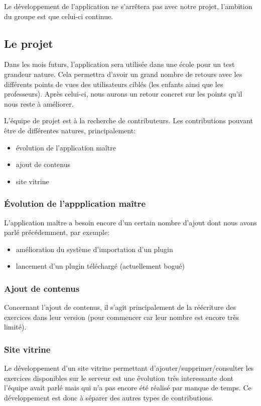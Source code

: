Le développement de l'application ne s'arrêtera pas avec notre projet, l'ambition du groupe est que celui-ci continue.


\subsection{Le projet}
Dans les mois futurs, l'application sera utilisée dans une école pour un test grandeur nature. 
Cela permettra d'avoir un grand nombre de retours avec les différents points de vues des utilisateurs ciblés (les enfants ainsi que les professeurs). 
Après celui-ci, nous aurons un retour concret sur les points qu'il nous reste à améliorer.


L'équipe de projet est à la recherche de contributeurs. Les contributions pouvant être de différentes natures, principalement:
\begin{itemize}
    \item évolution de l'application maître
    \item ajout de contenus
    \item site vitrine
\end{itemize}

\subsubsection{\'{E}volution de l'appplication maître}
L'application maître a besoin encore d'un certain nombre d'ajout dont nous avons parlé précédemment, par exemple:
\begin{itemize}
    \item amélioration du système d'importation d'un plugin
    \item lancement d'un plugin téléchargé (actuellement bogué)
\end{itemize}

\subsubsection{Ajout de contenus}
Concernant l'ajout de contenus, il s'agit principalement de la réécriture des exercices dans leur version \android{} (pour commencer car leur nombre est encore très limité).

\subsubsection{Site vitrine}
Le développement d'un site vitrine permettant d'ajouter/supprimer/consulter les exercices disponibles sur le serveur est une évolution très interessante dont l'équipe avait parlé mais qui n'a pas encore été réalisé par manque de temps. Ce développement est donc à séparer des autres \og{}types\fg{} de contributions.

